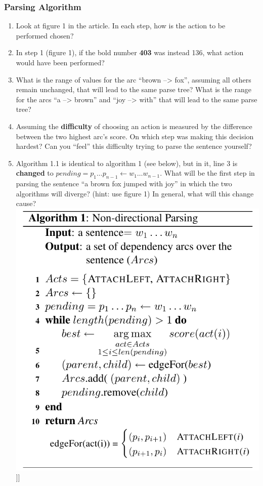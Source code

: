\documentclass[11pt]{article}
\begin{document}
\subsubsection{Parsing Algorithm}
\label{sec-7-2-2}


\begin{enumerate}
\item Look at figure 1 in the article. In each step, how is the action
    to be performed chosen?
\item In step 1 (figure 1), if the bold number \textbf{403} was instead 136,
   what action would have been performed?
\item What is the range of values for the arc ``brown --> fox'', assuming
   all others remain unchanged, that will lead to the same parse tree?
   What is the range for the arcs ``a --> brown'' and ``joy --> with''
   that will lead to the same parse tree?
\item Assuming the \textbf{difficulty} of choosing an action is measured by the
   difference between the two highest arc's score. On which step was
   making this decision hardest? Can you ``feel'' this difficulty trying
   to parse the sentence yourself?
\item Algorithm 1.1 is identical to algorithm 1 (see below), but in it, line 3 is \textbf{changed} to
   $pending = p_{1} \ldots p_{n-1} \leftarrow w_{1} \ldots w_{n-1}$.
   What will be the first step in parsing the sentence ``a brown fox
   jumped with joy'' in which the two algorithms will diverge? (hint:
   use figure 1) 
   In general, what will this change cause? \\
   \includegraphics[width=.9\linewidth]{images/Algorithm1.png}]] \\

\end{enumerate}
\end{document}

